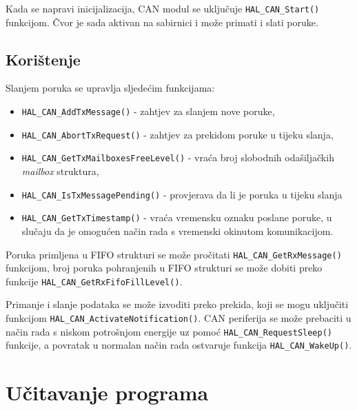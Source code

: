 \noindent Kada se napravi inicijalizacija, CAN modul se uključuje \verb|HAL_CAN_Start()| funkcijom. Čvor je sada aktivan na sabirnici i može primati i slati poruke.

\subsection{Korištenje}

Slanjem poruka se upravlja sljedećim funkcijama:
\begin{itemize}
	\item \verb|HAL_CAN_AddTxMessage()| - zahtjev za slanjem nove poruke,
	\item \verb|HAL_CAN_AbortTxRequest()| - zahtjev za prekidom poruke u tijeku slanja,
	\item \verb|HAL_CAN_GetTxMailboxesFreeLevel()| - vraća broj slobodnih odašiljačkih \textit{mailbox} struktura,
	\item \verb|HAL_CAN_IsTxMessagePending()| - provjerava da li je poruka u tijeku slanja
	\item \verb|HAL_CAN_GetTxTimestamp()| - vraća vremensku oznaku poslane poruke, u slučaju da je omogućen način rada s vremenski okinutom komunikacijom.
\end{itemize}
\noindent Poruka primljena u FIFO strukturi se može pročitati \verb|HAL_CAN_GetRxMessage()| funkcijom, broj poruka pohranjenih u FIFO strukturi se može dobiti preko funkcije \verb|HAL_CAN_GetRxFifoFillLevel()|.

Primanje i slanje podataka se može izvoditi preko prekida, koji se mogu uključiti funkcijom \verb|HAL_CAN_ActivateNotification()|. CAN periferija se može prebaciti u način rada s niskom potrošnjom energije uz pomoć \verb|HAL_CAN_RequestSleep()| funkcije, a povratak u normalan način rada ostvaruje funkcija \verb|HAL_CAN_WakeUp()|.

\section{Učitavanje programa}

